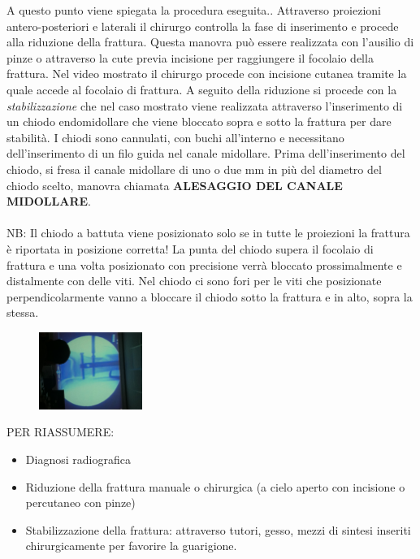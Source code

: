A questo punto viene spiegata la procedura eseguita.. Attraverso proiezioni antero-posteriori e laterali il chirurgo controlla la fase di inserimento e procede alla riduzione della frattura. Questa manovra può
essere realizzata con l'ausilio di pinze o attraverso la cute previa incisione per raggiungere il focolaio della frattura. Nel video mostrato il chirurgo procede con incisione cutanea tramite la quale accede al
focolaio di frattura. A seguito della riduzione si procede con la \emph{stabilizzazione} che nel caso mostrato viene realizzata attraverso l'inserimento di un chiodo endomidollare che viene bloccato sopra e
sotto la frattura per dare stabilità. I chiodi sono cannulati, con buchi all'interno e necessitano dell'inserimento di un filo guida nel canale
midollare. Prima dell'inserimento del chiodo, si fresa il canale
midollare di uno o due mm in più del diametro del chiodo scelto, manovra
chiamata \textbf{ALESAGGIO DEL CANALE MIDOLLARE}.
\\\\
NB: Il chiodo a battuta viene posizionato solo se in tutte le proiezioni la frattura è riportata in posizione corretta! La punta del chiodo supera il focolaio di frattura e una volta posizionato con precisione verrà bloccato prossimalmente e distalmente con delle viti. Nel chiodo ci sono fori per le viti che posizionate perpendicolarmente vanno a bloccare il
chiodo sotto la frattura e in alto, sopra la stessa.

\begin{figure}[!ht]
\centering
\includegraphics[width=0.3\textwidth]{001/image9.jpeg}
\end{figure}

PER RIASSUMERE:
\begin{itemize}
\item Diagnosi radiografica
\item Riduzione della frattura manuale o chirurgica (a cielo aperto con incisione o percutaneo con pinze)
\item Stabilizzazione della frattura: attraverso tutori, gesso, mezzi di sintesi inseriti chirurgicamente per favorire la guarigione.
\end{itemize}

